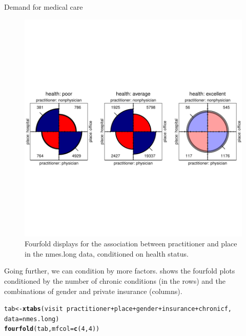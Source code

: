 \documentclass[11pt]{book}\usepackage[]{graphicx}\usepackage[]{color}
\makeatletter
\newcommand{\hlnum}[1]{\textcolor[rgb]{0.686,0.059,0.569}{#1}}%
\newcommand{\hlopt}[1]{\textcolor[rgb]{0,0,0}{#1}}%
\newcommand{\hlstd}[1]{\textcolor[rgb]{0.345,0.345,0.345}{#1}}%
\newcommand{\hlkwb}[1]{\textcolor[rgb]{0.69,0.353,0.396}{#1}}%
\newcommand{\hlkwc}[1]{\textcolor[rgb]{0.333,0.667,0.333}{#1}}%
\newcommand{\hlkwd}[1]{\textcolor[rgb]{0.737,0.353,0.396}{\textbf{#1}}}%
\newenvironment{kframe}{%
 \def\at@end@of@kframe{}%
 \ifinner\ifhmode%
  \def\at@end@of@kframe{\end{minipage}}%
  \begin{minipage}{\columnwidth}%
 \fi\fi%
 \def\FrameCommand##1{\hskip\@totalleftmargin \hskip-\fboxsep
 \colorbox{shadecolor}{##1}\hskip-\fboxsep
     \hskip-\linewidth \hskip-\@totalleftmargin \hskip\columnwidth}%
 \MakeFramed {\advance\hsize-\width
   \@totalleftmargin\z@ \linewidth\hsize
   \@setminipage}}%
 {\par\unskip\endMakeFramed%
 \at@end@of@kframe}
\newenvironment{knitrout}{}{} %
\renewenvironment{knitrout}{\small\renewcommand{\baselinestretch}{.85}}{} %
\makeatother
\begin{document}
\begin{Example}[nmes4]{Demand for medical care}
\begin{knitrout}
\begin{figure}[!htbp]
\centerline{\includegraphics[width=\textwidth,trim=0 130 0 130,clip]{ch09/fig/nmes4-fourfold1-1} }

\caption[Fourfold displays for the association between practitioner and place in the nmes]{Fourfold displays for the association between practitioner and place in the nmes.long data, conditioned on health status.\label{fig:nmes4-fourfold1}}
\end{figure}


\end{knitrout}

Going further, we can condition by  more factors.   shows the fourfold plots conditioned by
the number of chronic conditions (in the rows) and the combinations of
gender and  private insurance (columns).

\begin{knitrout}
\color{fgcolor}\begin{kframe}
\begin{alltt}
\hlstd{tab} \hlkwb{<-} \hlkwd{xtabs}\hlstd{(visit} \hlopt{~} \hlstd{practitioner} \hlopt{+} \hlstd{place} \hlopt{+} \hlstd{gender} \hlopt{+} \hlstd{insurance} \hlopt{+} \hlstd{chronicf,}
             \hlkwc{data}\hlstd{=nmes.long)}
\hlkwd{fourfold}\hlstd{(tab,} \hlkwc{mfcol}\hlstd{=}\hlkwd{c}\hlstd{(}\hlnum{4}\hlstd{,}\hlnum{4}\hlstd{))}
\end{alltt}
\end{kframe}\begin{figure}[!htbp]


\end{figure}
\end{knitrout}
\end{Example}
\end{document}
